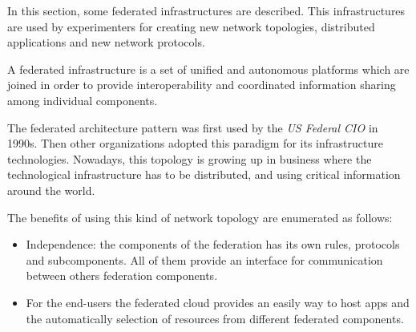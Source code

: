 In this section, some federated infrastructures are described. This
infrastructures are used by experimenters for creating new network topologies,
 distributed applications and new network protocols.

A federated infrastructure is a set of unified and autonomous platforms which
are joined in order to provide interoperability and coordinated
information sharing among individual components.

The federated architecture pattern was first used by the \emph{US Federal CIO} in
1990s. Then other organizations adopted this paradigm for its infrastructure
technologies. Nowadays, this topology is growing up in business where the
technological infrastructure has to be distributed, and using critical information around the world.

The benefits of using this kind of network topology are enumerated as follows:
\begin{itemize}
\item Independence: the components of the federation has its own rules,
  protocols and subcomponents. All of them provide an interface for
  communication between others federation components.
\item For the end-users the federated cloud provides an easily way to host apps
  and the automatically selection of resources from different federated components.
\end{itemize}

